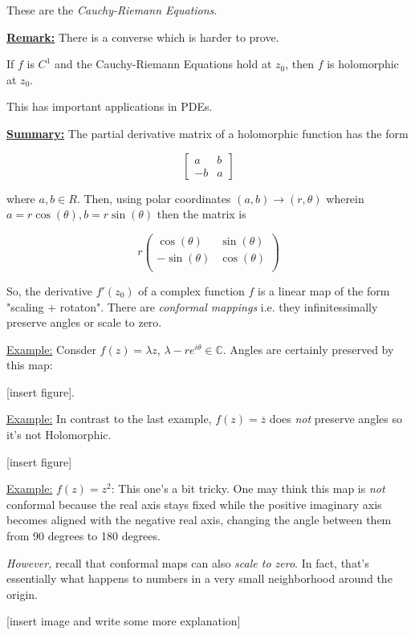 \documentclass{article}
\newcommand{\C}{\mathbb{C}}
\begin{document}
These are the \emph{Cauchy-Riemann Equations}.

\vskip 0.5cm
\underline{\textbf{Remark:}} There is a converse which is harder to prove. 
\begin{dottedbox}
  If $f$ is $C^1$ and the Cauchy-Riemann Equations hold at $z_0$, then $f$ is holomorphic at $z_0$.
\end{dottedbox}

This has important applications in PDEs.

\vskip 1cm
\underline{\textbf{Summary:}} The partial derivative matrix of a holomorphic function has the form 

\[ \begin{bmatrix}
  a & b \\
  -b & a
\end{bmatrix} \]

\vskip 0.25cm
where $a, b \in R$. Then, using polar coordinates $(a, b) \rightarrow (r, \theta)$ wherein $a = r\cos(\theta), b = r \sin(\theta)$ then the matrix is 

\[ r \begin{pmatrix}
  \cos(\theta) & \sin(\theta) \\
  -\sin(\theta) & \cos(\theta) \\
\end{pmatrix} \]

\vskip 0.25cm
So, the derivative $f'(z_0)$ of a complex function $f$ is a linear map of the form "scaling + rotaton". There are \emph{conformal mappings} i.e. they infinitessimally preserve angles or scale to zero.

\vskip 0.5cm
\underline{{Example:}} Consder $f(z) = \lambda z$, $\lambda - r e^{i \theta} \in \C$. Angles are certainly preserved by this map:

[insert figure].

\vskip 0.5cm
\underline{{Example:}} In contrast to the last example, $f(z) = \overline{z}$ does \emph{not} preserve angles so it's not Holomorphic.

[insert figure]

\vskip 0.5cm
\underline{Example:} $f(z) = z^2$: This one's a bit tricky. One may think this map is \emph{not} conformal because the real axis stays fixed while the positive imaginary axis becomes aligned with the negative real axis, changing the angle between them from 90 degrees to 180 degrees.

\vskip 0.5cm
\emph{However,} recall that conformal maps can also \emph{scale to zero}. In fact, that's essentially what happens to numbers in a very small neighborhood around the origin.

[insert image and write some more explanation]
\end{document}
